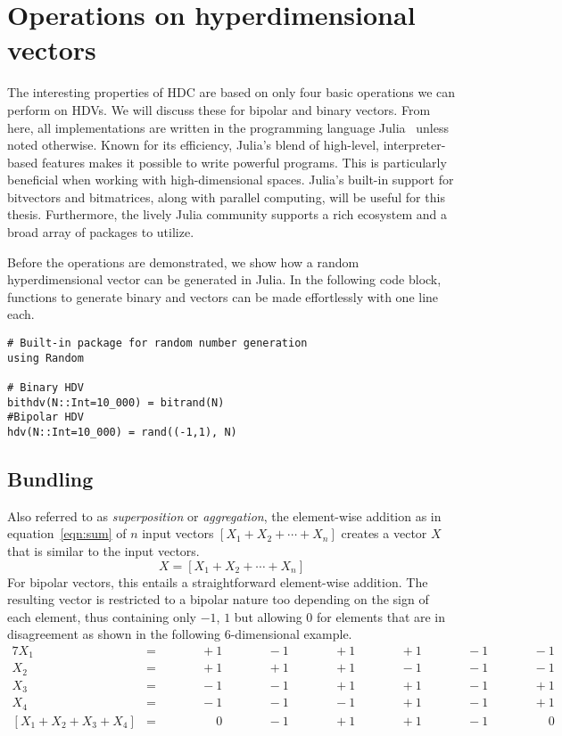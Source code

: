 \section{Operations on hyperdimensional vectors}
The interesting properties of HDC are based on only four basic operations we can perform on HDVs. We will discuss these for bipolar and binary vectors. From here, all implementations are written in the programming language Julia~\cite{Julia} unless noted otherwise. Known for its efficiency, Julia's blend of high-level, interpreter-based features makes it possible to write powerful programs. This is particularly beneficial when working with high-dimensional spaces. Julia's built-in support for bitvectors and bitmatrices, along with parallel computing, will be useful for this thesis. Furthermore, the lively Julia community supports a rich ecosystem and a broad array of packages to utilize.

Before the operations are demonstrated, we show how a random hyperdimensional vector can be generated in Julia. In the following code block, functions to generate binary and vectors can be made effortlessly with one line each.

\begin{verbatim}
# Built-in package for random number generation
using Random

# Binary HDV
bithdv(N::Int=10_000) = bitrand(N) 
#Bipolar HDV
hdv(N::Int=10_000) = rand((-1,1), N)
\end{verbatim}

\subsection*{Bundling} \label{sssec:add}
Also referred to as \textit{superposition} or \textit{aggregation}, the element-wise addition as in equation~\ref{eqn:sum} of $n$ input vectors $[X_{1} + X_{2} + \cdots + X_{n}]$ creates a vector $X$ that is similar to the input vectors.
\begin{equation}
    \label{eqn:sum}
    X = [X_{1} + X_{2} + \cdots + X_{n}]
\end{equation}
For bipolar vectors, this entails a straightforward element-wise addition. The resulting vector is restricted to a bipolar nature too depending on the sign of each element, thus containing only $-1$, $1$ but allowing $0$ for elements that are in disagreement as shown in the following $6$-dimensional example.
\begin{alignat*}{7}
    X_{1} &= && \qquad +1 && \qquad -1 && \qquad +1 && \qquad +1 && \qquad -1 && \qquad -1 \\
    X_{2} &= && \qquad +1 && \qquad +1 && \qquad +1 && \qquad -1 && \qquad -1 && \qquad -1 \\
    X_{3} &= && \qquad -1 && \qquad -1 && \qquad +1 && \qquad +1 && \qquad -1 && \qquad +1 \\
    X_{4} &= && \qquad -1 && \qquad -1 && \qquad -1 && \qquad +1 && \qquad -1 && \qquad +1 \\
    \hline
    [X_{1} + X_{2} + X_{3} + X_{4}] &= && \qquad \phantom{-}0 && \qquad -1 && \qquad +1 && \qquad +1 && \qquad -1 && \qquad \phantom{-}0
\end{alignat*}

